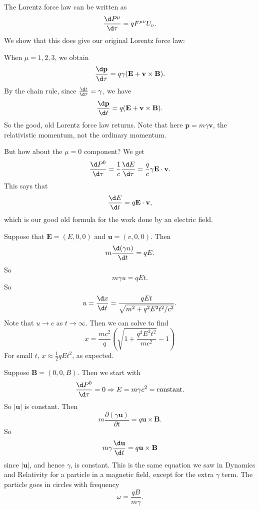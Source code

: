 \documentclass[a4paper]{article}
\begin{document}
The Lorentz force law can be written as
\[
  \frac{\d P^\mu}{\d \tau} = qF^{\mu\nu}U_\nu.
\]
We show that this does give our original Lorentz force law:

When $\mu = 1, 2, 3$, we obtain
\[
  \frac{\d \mathbf{p}}{\d \tau} = q\gamma (\mathbf{E} + \mathbf{v}\times \mathbf{B}).
\]
By the chain rule, since $\frac{\d t}{\d \tau} = \gamma$, we have
\[
  \frac{\d \mathbf{p}}{\d t} = q(\mathbf{E}+ \mathbf{v}\times \mathbf{B}).
\]
So the good, old Lorentz force law returns. Note that here $\mathbf{p} = m\gamma \mathbf{v}$, the relativistic momentum, not the ordinary momentum.

But how about the $\mu = 0$ component? We get
\[
  \frac{\d P^0}{\d \tau} = \frac{1}{c}\frac{\d E}{\d \tau} = \frac{q}{c}\gamma \mathbf{E}\cdot \mathbf{v}.
\]
This says that
\[
  \frac{\d E}{\d t} = q\mathbf{E}\cdot \mathbf{v},
\]
which is our good old formula for the work done by an electric field.

\begin{eg}
  Suppose that $\mathbf{E} = (E, 0, 0)$ and $\mathbf{u} = (v, 0, 0)$. Then
  \[
    m\frac{\d (\gamma u)}{\d t} = qE.
  \]
  So
  \[
    m\gamma u = qEt.
  \]
  So
  \[
    u = \frac{\d x}{\d t} = \frac{qEt}{\sqrt{m^2 + q^2 E^2 t^2/c^2}}.
  \]
  Note that $u\to c$ as $t\to \infty$. Then we can solve to find
  \[
    x = \frac{mc^2}{q}\left(\sqrt{1 + \frac{q^2 E^2 t^2}{mc^2}} - 1\right)
  \]
  For small $t$, $x\approx \frac{1}{2}qEt^2$, as expected.
\end{eg}

\begin{eg}
  Suppose $\mathbf{B} = (0, 0, B)$. Then we start with
  \[
    \frac{\d P^0}{\d \tau} = 0 \Rightarrow E = m\gamma c^2 = \text{constant}.
  \]
  So $|\mathbf{u}|$ is constant. Then
  \[
    m\frac{\partial (\gamma \mathbf{u})}{\partial t} = q\mathbf{u}\times \mathbf{B}.
  \]
  So
  \[
    m\gamma \frac{\d \mathbf{u}}{\d t} = q\mathbf{u}\times \mathbf{B}
  \]
  since $|\mathbf{u}|$, and hence $\gamma$, is constant. This is the same equation we saw in Dynamics and Relativity for a particle in a magnetic field, except for the extra $\gamma$ term. The particle goes in circles with frequency
  \[
    \omega = \frac{qB}{m\gamma}.
  \]
\end{eg}
\end{document}
